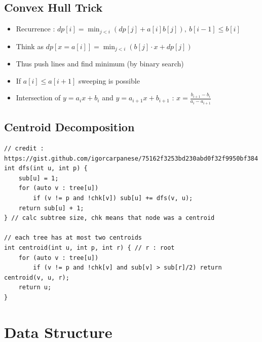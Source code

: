 \documentclass[landscape, 8pt, a4paper, oneside, twocolumn]{extarticle}
\begin{document}
\subsection{Convex Hull Trick}
\begin{itemize}
\item Recurrence : $ dp[i] = \min_{j<i} (dp[j] + a[i]b[j]),\ b[i-1] \leq b[i] $
\item Think as $ dp[x = a[i]] = \min_{j<i}(b[j] \cdot x + dp[j]) $
\item Thus push lines and find minimum (by binary search)
\item If $ a[i] \leq a[i+1] $ sweeping is possible
\item Intersection of $ y = a_ix +b_i $ and $ y = a_{i+1}x + b_{i+1} $ : $ x = \frac{b_{i+1}-b_i}{a_i-a_{i+1}} $
\end{itemize}

\subsection{Centroid Decomposition}
\begin{verbatim}
// credit : https://gist.github.com/igorcarpanese/75162f3253bd230abd0f32f9950bf384
int dfs(int u, int p) {
    sub[u] = 1;
    for (auto v : tree[u])
        if (v != p and !chk[v]) sub[u] += dfs(v, u);
    return sub[u] + 1;
} // calc subtree size, chk means that node was a centroid

// each tree has at most two centroids
int centroid(int u, int p, int r) { // r : root
    for (auto v : tree[u])
        if (v != p and !chk[v] and sub[v] > sub[r]/2) return centroid(v, u, r);
    return u;
}
\end{verbatim}

\section{Data Structure}
\end{document}
